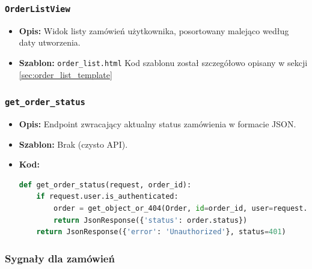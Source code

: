 \documentclass[12pt,a4paper,oneside]{article}
\theoremstyle{definition}
\numberwithin{equation}{section}
\begin{document}
\subsubsection*{\texttt{OrderListView}}
\begin{itemize}
    \item \textbf{Opis:} Widok listy zamówień użytkownika, posortowany malejąco według daty utworzenia.
    \item \textbf{Szablon:} \texttt{order\_list.html}
        \subsubitem Kod szablonu został szczegółowo opisany w sekcji  \ref{sec:order_list_template}
\end{itemize}

\subsubsection*{\texttt{get\_order\_status}}
\begin{itemize}
    \item \textbf{Opis:} Endpoint zwracający aktualny status zamówienia w formacie JSON.
    \item \textbf{Szablon:} Brak (czysto API).
    \item \textbf{Kod:}
    \begin{lstlisting}[language=Python]
def get_order_status(request, order_id):
    if request.user.is_authenticated:
        order = get_object_or_404(Order, id=order_id, user=request.user)
        return JsonResponse({'status': order.status})
    return JsonResponse({'error': 'Unauthorized'}, status=401)
    \end{lstlisting}
\end{itemize}

\subsubsection{Sygnały dla zamówień}
\end{document}
